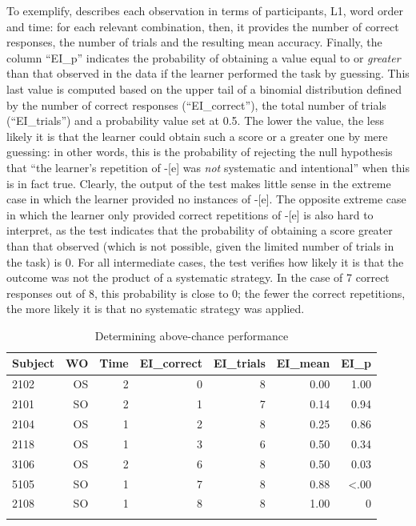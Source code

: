 To exemplify,  describes each observation in terms of participants, L1, word order and time: for each relevant combination, then, it provides the number of correct responses, the number of trials and the resulting mean accuracy. Finally, the column “EI\_p” indicates the probability of obtaining a value equal to or \textit{greater} than that observed in the data if the learner performed the task by guessing. This last value is computed based on the upper tail of a binomial distribution defined by the number of correct responses (“EI\_correct”), the total number of trials (“EI\_trials”) and a probability value set at 0.5. The lower the value, the less likely it is that the learner could obtain such a score or a greater one by mere guessing: in other words, this is the probability of rejecting the null hypothesis that “the learner’s repetition of -[e] was \textit{not} systematic and intentional” when this is in fact true. Clearly, the output of the test makes little sense in the extreme case in which the learner provided no instances of -[e]. The opposite extreme case in which the learner only provided correct repetitions of -[e] is also hard to interpret, as the test indicates that the probability of obtaining a score greater than that observed (which is not possible, given the limited number of trials in the task) is 0. For all intermediate cases, the test verifies how likely it is that the outcome was not the product of a systematic strategy. In the case of 7 correct responses out of 8, this probability is close to 0; the fewer the correct repetitions, the more likely it is that no systematic strategy was applied.

\begin{table}
    \begin{tabularx}{\textwidth}{Xrrrrrr}
    \lsptoprule
     Subject & WO & Time & EI\_correct & EI\_trials & EI\_mean & EI\_p\\
     \midrule
     2102 & OS & 2 & 0 & 8 & 0.00 & 1.00\\
     2101 & SO & 2 & 1 & 7 & 0.14 & 0.94\\
     2104 & OS & 1 & 2 & 8 & 0.25 & 0.86\\
     2118 & OS & 1 & 3 & 6 & 0.50 & 0.34\\
     3106 & OS & 2 & 6 & 8 & 0.50 & 0.03\\
     5105 & SO & 1 & 7 & 8 & 0.88 & <.00\\
     2108 & SO & 1 & 8 & 8 & 1.00 & 0\\
    \lspbottomrule
    \end{tabularx}
    \caption{Determining above-chance performance}
    \label{tab:04:6}
\end{table}

